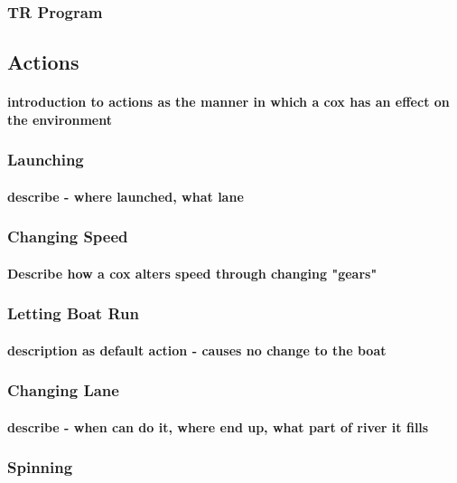       \subsubsection{TR Program}
    
    \subsection{Actions}
      \paragraph{introduction to actions as the manner in which a cox has an effect on the environment}
      \subsubsection{Launching}
        \paragraph{describe - where launched, what lane}
      \subsubsection{Changing Speed}
        \paragraph{Describe how a cox alters speed through changing "gears"}
      \subsubsection{Letting Boat Run}
        \paragraph{description as default action - causes no change to the boat}
      \subsubsection{Changing Lane}
        \paragraph{describe - when can do it, where end up, what part of river it fills}
      \subsubsection{Spinning}
